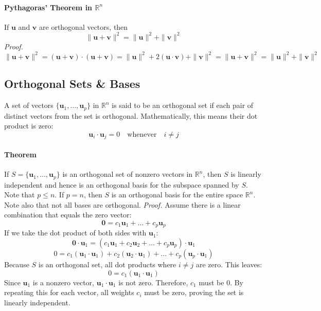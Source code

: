\documentclass[../linear-algebra.tex]{subfiles}
\begin{document}
\paragraph{Pythagoras' Theorem in $\mathbb{R}^n$} If $\mathbf{u}$ and $\mathbf{v}$ are orthogonal vectors, then
$$\|\mathbf{u} + \mathbf{v}\|^2 = \|\mathbf{u}\|^2 + \|\mathbf{v}\|^2$$
\textit{Proof.} $$\|\mathbf{u} + \mathbf{v}\|^2 = (\mathbf{u} + \mathbf{v}) \cdot (\mathbf{u} + \mathbf{v}) = \|\mathbf{u}\|^2 + 2(\mathbf{u} \cdot \mathbf{v}) + \|\mathbf{v}\|^2 = \|\mathbf{u} + \mathbf{v}\|^2 = \|\mathbf{u}\|^2 + \|\mathbf{v}\|^2$$

\subsection{Orthogonal Sets \& Bases}
A set of vectors $\{\mathbf{u}_1, \dots, \mathbf{u}_p\}$ in $\mathbb{R}^n$ is said to be an orthogonal set if each pair of distinct vectors from the set is orthogonal. Mathematically, this means their dot product is zero:
$$\mathbf{u}_i \cdot \mathbf{u}_j = 0 \quad \text{whenever} \quad i \neq j$$
\paragraph{Theorem} If $S = \{\mathbf{u}_1, \dots, \mathbf{u}_p\}$ is an orthogonal set of nonzero vectors in $\mathbb{R}^n$, then $S$ is linearly independent and hence is an orthogonal basis for the subspace spanned by $S$.\newline
Note that $p \leq n$. If $p=n$, then $S$ is an orthogonal basis for the entire space $\mathbb{R}^n$. \newline
Note also that not all bases are orthogonal.\newline
\textit{Proof.} Assume there is a linear combination that equals the zero vector:
$$\mathbf{0} = c_1\mathbf{u}_1 + \dots + c_p\mathbf{u}_p$$
If we take the dot product of both sides with $\mathbf{u}_1$:
$$\mathbf{0} \cdot \mathbf{u}_1 = (c_1\mathbf{u}_1 + c_2\mathbf{u}_2 + \dots + c_p\mathbf{u}_p) \cdot \mathbf{u}_1$$
$$0 = c_1(\mathbf{u}_1 \cdot \mathbf{u}_1) + c_2(\mathbf{u}_2 \cdot \mathbf{u}_1) + \dots + c_p(\mathbf{u}_p \cdot \mathbf{u}_1)$$
Because $S$ is an orthogonal set, all dot products where $i \neq j$ are zero. This leaves:
$$0 = c_1(\mathbf{u}_1 \cdot \mathbf{u}_1)$$
Since $\mathbf{u}_1$ is a nonzero vector, $\mathbf{u}_1 \cdot \mathbf{u}_1$ is not zero. Therefore, $c_1$ must be $0$. By repeating this for each vector, all weights $c_i$ must be zero, proving the set is linearly independent.
\end{document}
